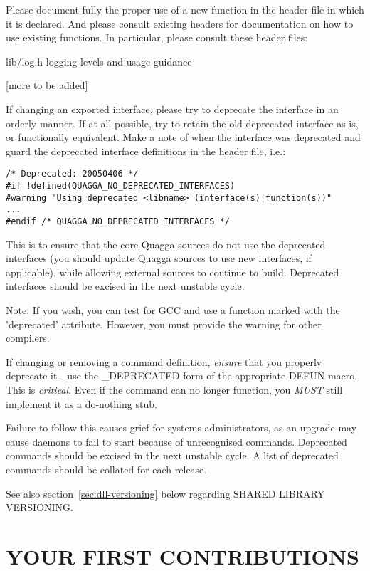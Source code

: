 \documentclass[oneside]{article}
\begin{document}
Please document fully the proper use of a new function in the header file
in which it is declared.  And please consult existing headers for
documentation on how to use existing functions.  In particular, please consult
these header files:

\begin{description}
  \item{lib/log.h}	logging levels and usage guidance
  \item{[more to be added]}
\end{description}

If changing an exported interface, please try to deprecate the interface in
an orderly manner. If at all possible, try to retain the old deprecated
interface as is, or functionally equivalent. Make a note of when the
interface was deprecated and guard the deprecated interface definitions in
the header file, i.e.:

\begin{verbatim}
/* Deprecated: 20050406 */
#if !defined(QUAGGA_NO_DEPRECATED_INTERFACES)
#warning "Using deprecated <libname> (interface(s)|function(s))"
...
#endif /* QUAGGA_NO_DEPRECATED_INTERFACES */
\end{verbatim}

This is to ensure that the core Quagga sources do not use the deprecated
interfaces (you should update Quagga sources to use new interfaces, if
applicable), while allowing external sources to continue to build. 
Deprecated interfaces should be excised in the next unstable cycle.

Note: If you wish, you can test for GCC and use a function
marked with the 'deprecated' attribute. However, you must provide the
warning for other compilers.

If changing or removing a command definition, \emph{ensure} that you
properly deprecate it - use the \_DEPRECATED form of the appropriate DEFUN
macro.  This is \emph{critical}.  Even if the command can no longer
function, you \emph{MUST} still implement it as a do-nothing stub. 

Failure to follow this causes grief for systems administrators, as an
upgrade may cause daemons to fail to start because of unrecognised commands. 
Deprecated commands should be excised in the next unstable cycle.  A list of
deprecated commands should be collated for each release.

See also section~\ref{sec:dll-versioning} below regarding SHARED LIBRARY
VERSIONING.

\section{YOUR FIRST CONTRIBUTIONS}
\end{document}
